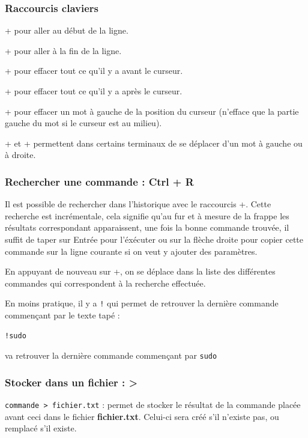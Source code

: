 \documentclass[a4paper,twoside]{article}
\begin{document}
\subsubsection{Raccourcis claviers}
 +  pour aller au début de la ligne.

 +  pour aller à  la fin de la ligne.

 +  pour effacer tout ce qu'il y a avant le curseur.

 +  pour effacer tout ce qu'il y a après le curseur.

 +  pour effacer un mot à gauche de la position du curseur (n'efface que la partie gauche du mot si le curseur est au milieu).

 + \touche{$\rightarrow$} et  + \touche{$\leftarrow$} permettent dans certains terminaux de se déplacer d'un mot à gauche ou à droite.

\subsubsection{Rechercher une commande : Ctrl + R}
Il est possible de rechercher dans l'historique avec le raccourcis +. Cette recherche est incrémentale, cela signifie qu'au fur et à mesure de la frappe les résultats correspondant apparaissent, une fois la bonne commande trouvée, il suffit de taper sur Entrée pour l'éxécuter ou sur la flèche droite pour copier cette commande sur la ligne courante si on veut y ajouter des paramètres.

\begin{remarque}
En appuyant de nouveau sur +, on se déplace dans la liste des différentes commandes qui correspondent à la recherche effectuée.
\end{remarque}

\bigskip

En moins pratique, il y a \texttt{!} qui permet de retrouver la dernière commande commençant par le texte tapé : 
\begin{verbatim}
!sudo
\end{verbatim}
va retrouver la dernière commande commençant par \texttt{sudo}

\subsubsection{Stocker dans un fichier : >}
\verb|commande > fichier.txt| : permet de stocker le résultat de la commande placée avant ceci dans le fichier \textbf{fichier.txt}. Celui-ci sera créé s'il n'existe pas, ou remplacé s'il existe.
\end{document}
